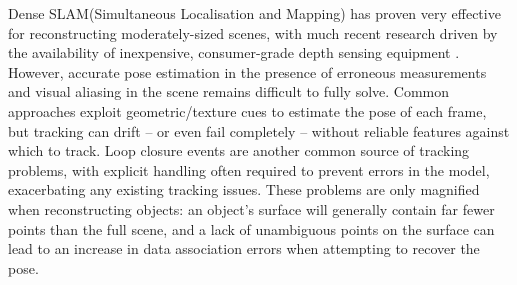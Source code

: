 Dense SLAM(Simultaneous Localisation and Mapping) has proven very effective for reconstructing moderately-sized scenes,
with much recent research driven by the availability of inexpensive, consumer-grade depth sensing equipment \cite{Newcombe2011,Niessner2013,Prisacariu2014}. 
However, accurate pose estimation in the presence of erroneous measurements and visual aliasing in the scene remains difficult to fully solve. Common approaches \cite{Besl1992,Levoy2001} exploit geometric/texture cues to estimate the pose of each frame, but tracking can drift -- or even fail completely -- without reliable features against which to track.
Loop closure events are another common source of tracking problems, with explicit handling often required to prevent errors in the model, exacerbating any existing tracking issues.
These problems are only magnified when reconstructing objects: an object's surface will generally contain far fewer points than the full scene, and a lack of unambiguous points on the surface can lead to an increase in data association errors when attempting to recover the pose.




